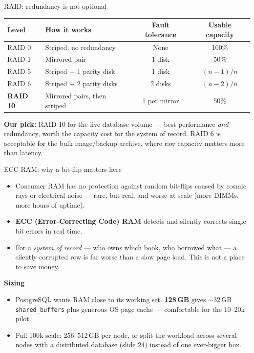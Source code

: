 \documentclass[aspectratio=169,10pt]{beamer}
\newcommand{\eyebrow}[1]{{\small\color{sovGold}\textbf{#1}}}
\begin{document}
\begin{frame}{RAID: redundancy is not optional}
  \small
  \renewcommand{\arraystretch}{1.2}
  \begin{tabularx}{\linewidth}{@{}l>{\raggedright\arraybackslash}X cc@{}}
    \toprule
    \textbf{Level} & \textbf{How it works} & \textbf{Fault tolerance} & \textbf{Usable capacity} \\
    \midrule
    RAID 0 & Striped, no redundancy & None & 100\% \\
    RAID 1 & Mirrored pair & 1 disk & 50\% \\
    RAID 5 & Striped + 1 parity disk & 1 disk & $(n-1)/n$ \\
    RAID 6 & Striped + 2 parity disks & 2 disks & $(n-2)/n$ \\
    \textbf{RAID 10} & Mirrored pairs, then striped & 1 per mirror & 50\% \\
    \bottomrule
  \end{tabularx}
  \vspace{10pt}
  \begin{takeaway}
   \textbf{Our pick:} RAID 10 for the live database volume --- best performance \emph{and} redundancy, worth the capacity cost for the system of record. RAID 6 is acceptable for the bulk image/backup archive, where raw capacity matters more than latency.
  \end{takeaway}
\end{frame}

\begin{frame}{ECC RAM: why a bit-flip matters here}
  \begin{itemize}
    \item Consumer RAM has no protection against random bit-flips caused by cosmic rays or electrical noise --- rare, but real, and worse at scale (more DIMMs, more hours of uptime).
    \item \textbf{ECC (Error-Correcting Code) RAM} detects and silently corrects single-bit errors in real time.
    \item For a \emph{system of record} --- who owns which book, who borrowed what --- a silently corrupted row is far worse than a slow page load. This is not a place to save money.
  \end{itemize}
  \vspace{8pt}
  \eyebrow{Sizing}
  \begin{itemize}
    \item PostgreSQL wants RAM close to its working set. \textbf{128\,GB} gives $\sim$32\,GB \texttt{shared\_buffers} plus generous OS page cache --- comfortable for the 10--20k pilot.
    \item Full 100k scale: 256--512\,GB per node, or split the workload across several nodes with a distributed database (slide 24) instead of one ever-bigger box.
  \end{itemize}
\end{frame}
\end{document}
